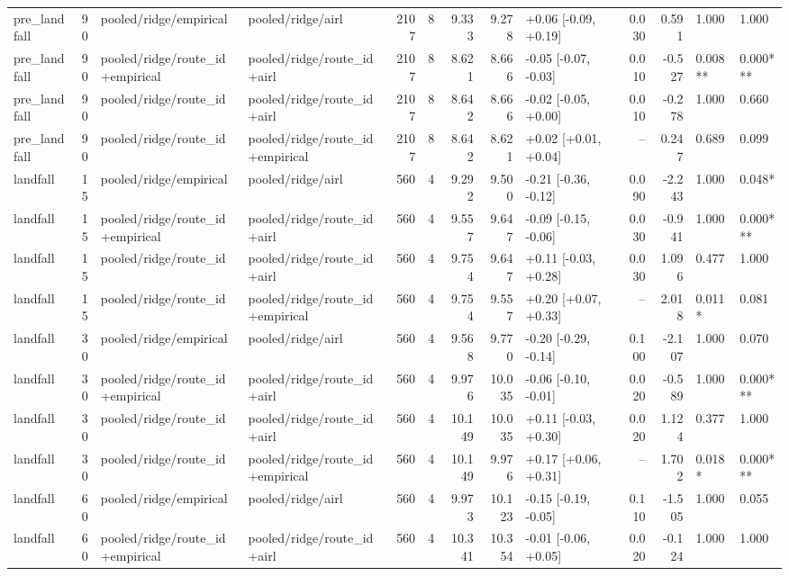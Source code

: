 \begin{tabular}{lrllrrrrlrrll}
pre_landfall & 90 & pooled/ridge/empirical & pooled/ridge/airl & 2107 & 8 & 9.333 & 9.278 & +0.06 [-0.09, +0.19] & 0.030 & 0.591 & 1.000 & 1.000 \\
pre_landfall & 90 & pooled/ridge/route_id+empirical & pooled/ridge/route_id+airl & 2107 & 8 & 8.621 & 8.666 & -0.05 [-0.07, -0.03] & 0.010 & -0.527 & 0.008** & 0.000*** \\
pre_landfall & 90 & pooled/ridge/route_id & pooled/ridge/route_id+airl & 2107 & 8 & 8.642 & 8.666 & -0.02 [-0.05, +0.00] & 0.010 & -0.278 & 1.000 & 0.660 \\
pre_landfall & 90 & pooled/ridge/route_id & pooled/ridge/route_id+empirical & 2107 & 8 & 8.642 & 8.621 & +0.02 [+0.01, +0.04] & -- & 0.247 & 0.689 & 0.099 \\
landfall & 15 & pooled/ridge/empirical & pooled/ridge/airl & 560 & 4 & 9.292 & 9.500 & -0.21 [-0.36, -0.12] & 0.090 & -2.243 & 1.000 & 0.048* \\
landfall & 15 & pooled/ridge/route_id+empirical & pooled/ridge/route_id+airl & 560 & 4 & 9.557 & 9.647 & -0.09 [-0.15, -0.06] & 0.030 & -0.941 & 1.000 & 0.000*** \\
landfall & 15 & pooled/ridge/route_id & pooled/ridge/route_id+airl & 560 & 4 & 9.754 & 9.647 & +0.11 [-0.03, +0.28] & 0.030 & 1.096 & 0.477 & 1.000 \\
landfall & 15 & pooled/ridge/route_id & pooled/ridge/route_id+empirical & 560 & 4 & 9.754 & 9.557 & +0.20 [+0.07, +0.33] & -- & 2.018 & 0.011* & 0.081 \\
landfall & 30 & pooled/ridge/empirical & pooled/ridge/airl & 560 & 4 & 9.568 & 9.770 & -0.20 [-0.29, -0.14] & 0.100 & -2.107 & 1.000 & 0.070 \\
landfall & 30 & pooled/ridge/route_id+empirical & pooled/ridge/route_id+airl & 560 & 4 & 9.976 & 10.035 & -0.06 [-0.10, -0.01] & 0.020 & -0.589 & 1.000 & 0.000*** \\
landfall & 30 & pooled/ridge/route_id & pooled/ridge/route_id+airl & 560 & 4 & 10.149 & 10.035 & +0.11 [-0.03, +0.30] & 0.020 & 1.124 & 0.377 & 1.000 \\
landfall & 30 & pooled/ridge/route_id & pooled/ridge/route_id+empirical & 560 & 4 & 10.149 & 9.976 & +0.17 [+0.06, +0.31] & -- & 1.702 & 0.018* & 0.000*** \\
landfall & 60 & pooled/ridge/empirical & pooled/ridge/airl & 560 & 4 & 9.973 & 10.123 & -0.15 [-0.19, -0.05] & 0.110 & -1.505 & 1.000 & 0.055 \\
landfall & 60 & pooled/ridge/route_id+empirical & pooled/ridge/route_id+airl & 560 & 4 & 10.341 & 10.354 & -0.01 [-0.06, +0.05] & 0.020 & -0.124 & 1.000 & 1.000 \\

\end{tabular}
